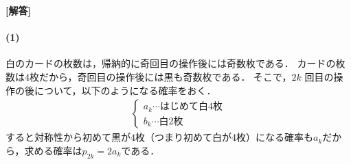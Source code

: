 \documentclass[../../main.tex]{subfiles}
\begin{document}
\begin{oframed}
  
\end{oframed}

{\bf [解答]}

\paragraph{(1)}

白のカードの枚数は，帰納的に奇回目の操作後には奇数枚である．
カードの枚数は$4$枚だから，奇回目の操作後には黒も奇数枚である．
そこで，$2k$ 回目の操作の後について，以下のようになる確率をおく．
\begin{align}
  \begin{cases}
    a_k \cdots \text{はじめて白4枚} \\
    b_k \cdots \text{白2枚}
  \end{cases}
\end{align}
すると対称性から初めて黒が$4$枚（つまり初めて白が4枚）になる確率も$a_k$だから，求める確率は$p_{2k}=2a_k$である．
\end{document}
